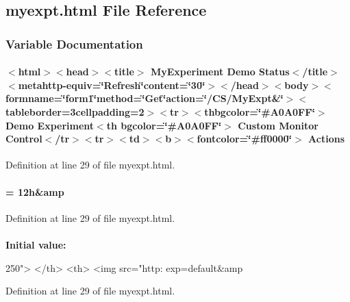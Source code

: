 \subsection{myexpt.html File Reference}
\label{myexpt_8html}


\subsubsection{Variable Documentation}
\paragraph[{Actions}]{\setlength{\rightskip}{0pt plus 5cm}$<$html$>$$<$head$>$$<$title$>$ MyExperiment Demo Status$<$/title$>$$<$metahttp-\/equiv=\char`\"{}Refresh\char`\"{}content=\char`\"{}30\char`\"{}$>$$<$/head$>$$<$body$>$$<$formname=\char`\"{}form1\char`\"{}method=\char`\"{}Get\char`\"{}action=\char`\"{}/CS/MyExpt\&\char`\"{}$>$$<$tableborder=3cellpadding=2$>$$<$tr$>$$<$thbgcolor=\char`\"{}\#A0A0FF\char`\"{}$>$ Demo Experiment$<$th bgcolor=\char`\"{}\#A0A0FF\char`\"{}$>$ Custom Monitor Control$<$/tr$>$$<$tr$>$$<$td$>$$<$b$>$$<$fontcolor=\char`\"{}\#ff0000\char`\"{}$>$ Actions}\hfill\label{myexpt_8html_ac26fc1b25ec1347d95b62621aa890be9}


Definition at line 29 of file myexpt.html.
\paragraph[{scale}]{ = 12h\&amp}\hfill\label{myexpt_8html_acec6d8ad52a28972fa74e071c1a63b6a}


Definition at line 29 of file myexpt.html.
\paragraph[{width}]{}\hfill\label{myexpt_8html_a5558ace5433f9aabbf0a0ec059900d94}
{\bfseries Initial value:}
\begin{DoxyCode}
250">
        </th>
        <th> <img src="http:
                        exp=default&amp
\end{DoxyCode}


Definition at line 29 of file myexpt.html.
